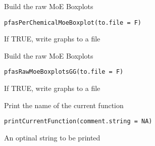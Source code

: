 \documentclass[a4paper]{book}
\begin{document}
%
\begin{Description}\relax
Build the raw MoE Boxplots
\end{Description}
%
\begin{Usage}
\begin{verbatim}
pfasPerChemicalMoeBoxplot(to.file = F)
\end{verbatim}
\end{Usage}
%
\begin{Arguments}
\begin{ldescription}
\item[\code{to.file}] If TRUE, write graphs to a file
\end{ldescription}
\end{Arguments}
%
\begin{Description}\relax
Build the raw MoE Boxplots
\end{Description}
%
\begin{Usage}
\begin{verbatim}
pfasRawMoeBoxplotsGG(to.file = F)
\end{verbatim}
\end{Usage}
%
\begin{Arguments}
\begin{ldescription}
\item[\code{to.file}] If TRUE, write graphs to a file
\end{ldescription}
\end{Arguments}
%
\begin{Description}\relax
Print the name of the current function
\end{Description}
%
\begin{Usage}
\begin{verbatim}
printCurrentFunction(comment.string = NA)
\end{verbatim}
\end{Usage}
%
\begin{Arguments}
\begin{ldescription}
\item[\code{comment.string}] An optinal string to be printed
\end{ldescription}
\end{Arguments}
\printindex{}
\end{document}
